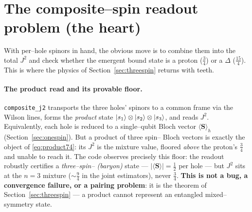 \documentclass[11pt,oneside]{article}
\newcommand{\expval}[1]{\langle #1 \rangle}
\newcommand{\code}[1]{\texttt{#1}}
\begin{document}
\section{The composite--spin readout problem (the heart)}
\label{sec:composite}

With per--hole spinors in hand, the obvious move is to combine them into the
total $J^2$ and check whether the emergent bound state is a proton ($\tfrac34$)
or a $\Delta$ ($\tfrac{15}{4}$). This is where the physics of
Section~\ref{sec:threespin} returns with teeth.

\paragraph{The product read and its provable floor.}
\code{composite\_j2} transports the three holes' spinors to a common frame via
the Wilson lines, forms the \emph{product} state
$\ket{s_1}\otimes\ket{s_2}\otimes\ket{s_3}$, and reads $J^2$. Equivalently, each
hole is reduced to a single--qubit Bloch vector $\expval{\bm S}_h$
(Section~\ref{sec:onespin}). But a product of three spin--\textonehalf{} Bloch
vectors is exactly the object of \eqref{eq:product74}: its $J^2$ is the
mixture value, floored \emph{above} the proton's $\tfrac34$ and unable to reach
it. The code observes precisely this floor: the readout robustly certifies a
\emph{three--spin--\textonehalf{} (baryon)} state --- $|\expval{\bm S}|=\tfrac12$
per hole --- but $J^2$ sits at the $n=3$ mixture ($\sim\tfrac94$ in the joint
estimators), never $\tfrac34$. \textbf{This is not a bug, a convergence
failure, or a pairing problem}: it is the theorem of
Section~\ref{sec:threespin} --- a product cannot represent an entangled
mixed--symmetry state.
\end{document}
